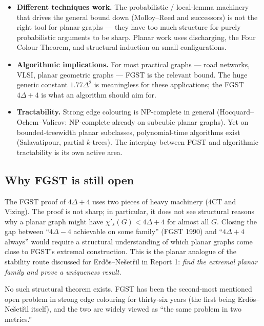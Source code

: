 \documentclass[11pt]{article}
\newcommand{\sci}{\chi'_s}
\begin{document}
\begin{itemize}[leftmargin=*, itemsep=2pt]
  \item \textbf{Different techniques work.} The probabilistic /
        local-lemma machinery that drives the general bound down
        (Molloy--Reed and successors) is not the right tool for
        planar graphs --- they have too much structure for purely
        probabilistic arguments to be sharp. Planar work uses
        discharging, the Four Colour Theorem, and structural
        induction on small configurations.
  \item \textbf{Algorithmic implications.} For most practical
        graphs --- road networks, VLSI, planar geometric graphs ---
        FGST is the relevant bound. The huge generic constant
        $1.77\Delta^2$ is meaningless for these applications; the
        FGST $4\Delta + 4$ is what an algorithm should aim for.
  \item \textbf{Tractability.} Strong edge colouring is NP-complete
        in general (Hocquard--Ochem--Valicov: NP-complete already
        on subcubic planar graphs). Yet on bounded-treewidth planar
        subclasses, polynomial-time algorithms exist
        (Salavatipour, partial $k$-trees). The interplay between
        FGST and algorithmic tractability is its own active area.
\end{itemize}

\subsection*{Why FGST is still open}

The FGST proof of $4\Delta + 4$ uses two pieces of heavy machinery
($4$CT and Vizing). The proof is not sharp; in particular, it does
not see structural reasons why a planar graph might have
$\sci(G) < 4\Delta + 4$ for almost all $G$. Closing the gap between
``$4\Delta - 4$ achievable on some family'' (FGST 1990) and
``$4\Delta + 4$ always'' would require a structural understanding
of which planar graphs come close to FGST's extremal construction.
This is the planar analogue of the stability route discussed for
Erd\H{o}s--Ne\v{s}et\v{r}il in Report 1: \emph{find the extremal
planar family and prove a uniqueness result.}

No such structural theorem exists. FGST has been the second-most
mentioned open problem in strong edge colouring for thirty-six
years (the first being Erd\H{o}s--Ne\v{s}et\v{r}il itself), and the
two are widely viewed as ``the same problem in two metrics.''
\end{document}
